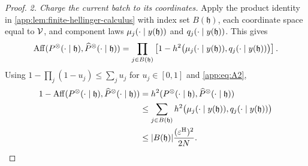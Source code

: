 \begin{proof}
\emph{2. Charge the current batch to its coordinates.}
Apply the product identity in \cref{app:lem:finite-hellinger-calculus}
with index set $B(\mathfrak h)$, each coordinate space equal to $\Vocab$,
and component laws $\ExactRow{y(\mathfrak h)}{j}$ and
$\OracleRow{y(\mathfrak h)}{j}$.  This gives
\begin{equation}
 \HellingerAffinity(\ExactBatchLaw{\mathfrak h},
                    \OracleBatchLaw{\mathfrak h})
 =\prod_{j\in B(\mathfrak h)}
  \left[1-\sqHellinger\bigl(
        \ExactRow{y(\mathfrak h)}{j},
        \OracleRow{y(\mathfrak h)}{j}\bigr)\right].
 \label{app:eq:upper-batch-affinity}
\end{equation}
Using $1-\prod_j(1-u_j)\le\sum_j u_j$ for $u_j\in[0,1]$ and
\textcolor{red}{\eqref{app:eq:A2}},
\begin{align}
 1-\HellingerAffinity(\ExactBatchLaw{\mathfrak h},
                      \OracleBatchLaw{\mathfrak h})
 &=\sqHellinger(\ExactBatchLaw{\mathfrak h},
                \OracleBatchLaw{\mathfrak h})
 \label{app:eq:local-batch-cost-definition}\\
 &\le\sum_{j\in B(\mathfrak h)}
     \sqHellinger\bigl(\ExactRow{y(\mathfrak h)}{j},
                      \OracleRow{y(\mathfrak h)}{j}\bigr)\notag\\
 &\le |B(\mathfrak h)|\frac{(\OracleRadius)^2}{2N}.
 \label{app:eq:local-batch-cost-bound}
\end{align}



\end{proof}
